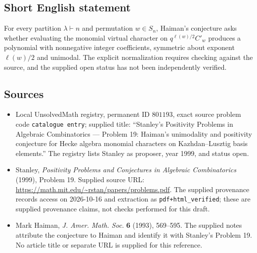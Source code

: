 \documentclass[11pt]{article}
\begin{document}
\subsection{Short English statement}
For every partition \(\lambda\vdash n\) and permutation \(w\in S_n\), Haiman's conjecture asks whether evaluating the monomial virtual character on \(q^{\ell(w)/2}C'_w\) produces a polynomial with nonnegative integer coefficients, symmetric about exponent \(\ell(w)/2\) and unimodal. The explicit normalization requires checking against the source, and the supplied open status has not been independently verified.
\subsection{Sources}
\begin{itemize}
\item Local UnsolvedMath registry, permanent ID \(801193\), exact source problem code \texttt{catalogue entry}; supplied title: ``Stanley's Positivity Problems in Algebraic Combinatorics --- Problem 19: Haiman's unimodality and positivity conjecture for Hecke algebra monomial characters on Kazhdan--Lusztig basis elements.'' The registry lists Stanley as proposer, year 1999, and status open.
\item Stanley, \emph{Positivity Problems and Conjectures in Algebraic Combinatorics} (1999), Problem 19. Supplied source URL: \url{https://math.mit.edu/~rstan/papers/problems.pdf}. The supplied provenance records access on 2026-10-16 and extraction as \texttt{pdf+html\_verified}; these are supplied provenance claims, not checks performed for this draft.
\item Mark Haiman, \emph{J. Amer. Math. Soc.} \textbf{6} (1993), 569--595. The supplied notes attribute the conjecture to Haiman and identify it with Stanley's Problem 19. No article title or separate URL is supplied for this reference.
\end{itemize}
\end{document}

